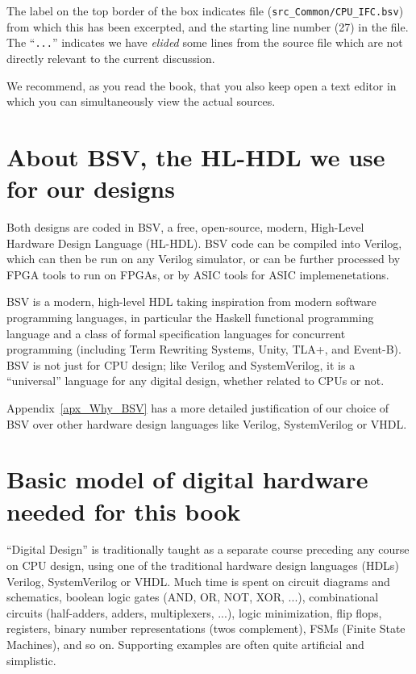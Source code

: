 

The label on the top border of the box indicates file
(\verb|src_Common/CPU_IFC.bsv|) from which this has been excerpted,
and the starting line number (27) in the file.  The ``\verb|...|''
indicates we have \emph{elided} some lines from the source file which
are not directly relevant to the current discussion.

We recommend, as you read the book, that you also keep open a text
editor in which you can simultaneously view the actual sources.


\section{About BSV, the HL-HDL we use for our designs}

Both designs are coded in BSV, a free, open-source, modern, High-Level
Hardware Design Language (HL-HDL).  BSV code can be compiled into
Verilog, which can then be run on any Verilog simulator, or can be
further processed by FPGA tools to run on FPGAs, or by ASIC tools for
ASIC implemenetations.

BSV is a modern, high-level HDL taking inspiration from modern
software programming languages, in particular the Haskell functional
programming language and a class of formal specification languages for
concurrent programming (including Term Rewriting Systems, Unity, TLA+,
and Event-B).  BSV is not just for CPU design; like Verilog and
SystemVerilog, it is a ``universal'' language for any digital design,
whether related to CPUs or not.

Appendix~\ref{apx_Why_BSV} has a more detailed justification of our
choice of BSV over other hardware design languages like Verilog,
SystemVerilog or VHDL.


\section{Basic model of digital hardware needed for this book}

``Digital Design'' is traditionally taught as a separate course
preceding any course on CPU design, using one of the traditional
hardware design languages (HDLs) Verilog, SystemVerilog or VHDL.  Much
time is spent on circuit diagrams and schematics, boolean logic gates
(AND, OR, NOT, XOR, ...), combinational circuits (half-adders, adders,
multiplexers, ...), logic minimization, flip flops, registers, binary
number representations (twos complement), FSMs (Finite State
Machines), and so on.  Supporting examples are often quite artificial
and simplistic.

